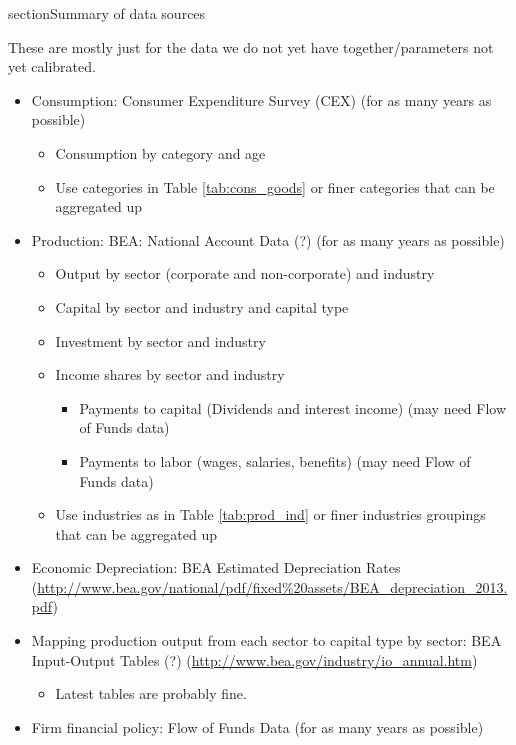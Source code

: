 \documentclass[article,11pt,letterpaper,fleqn]{article}
\theoremstyle{definition}
\numberwithin{equation}{section}
\begin{document}
section{Summary of data sources}
\label{sec:data}

These are mostly just for the data we do not yet have together/parameters not yet calibrated. 

\begin{itemize}
\item Consumption: Consumer Expenditure Survey (CEX) (for as many years as possible)
	\begin{itemize}
	\item Consumption by category and age
	\item Use categories in Table \ref{tab:cons_goods} or finer categories that can be aggregated up
	\end{itemize}
\item Production: BEA: National Account Data (?) (for as many years as possible)
	\begin{itemize}
	\item Output by sector (corporate and non-corporate) and industry
	\item Capital by sector and industry and capital type
	\item Investment by sector and industry
	\item Income shares by sector and industry
		\begin{itemize}
		\item Payments to capital (Dividends and interest income) (may need Flow of Funds data)
		\item Payments to labor (wages, salaries, benefits) (may need Flow of Funds data)
		\end{itemize}
	\item Use industries as in Table \ref{tab:prod_ind} or finer industries groupings that can be aggregated up
	\end{itemize}
\item Economic Depreciation: BEA Estimated Depreciation Rates (\url{http://www.bea.gov/national/pdf/fixed\%20assets/BEA_depreciation_2013.pdf})	
\item Mapping production output from each sector to capital type by sector: BEA Input-Output Tables (?) (\url{http://www.bea.gov/industry/io_annual.htm})
	\begin{itemize}
	\item Latest tables are probably fine.
	\end{itemize}
\item Firm financial policy: Flow of Funds Data (for as many years as possible)
	\begin{itemize}

\end{itemize}
\end{itemize}
\end{document}
